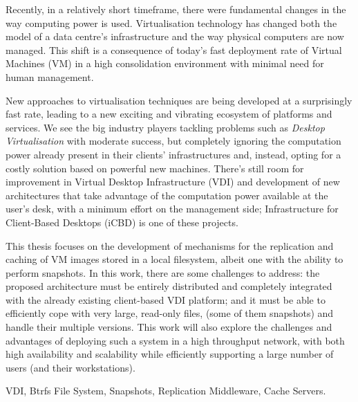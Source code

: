 
Recently, in a relatively short timeframe, there were fundamental changes in the way computing power is used. Virtualisation technology has changed both the model of a data centre’s infrastructure and the way physical computers are now managed. This shift is a consequence of today’s fast deployment rate of Virtual Machines (VM) in a high consolidation environment with minimal need for human management. 

New approaches to virtualisation techniques are being developed at a surprisingly fast rate, leading to a new exciting and vibrating ecosystem of platforms and services. We see the big industry players tackling problems such as \textit{Desktop Virtualisation} with moderate success, but completely ignoring the computation power already present in their clients’ infrastructures and, instead, opting for a costly solution based on powerful new machines. There’s still room for improvement in Virtual Desktop Infrastructure (VDI) and development of new architectures that take advantage of the computation power available at the user’s desk, with a minimum effort on the management side; Infrastructure for Client-Based Desktops (iCBD) is one of these projects. 

This thesis focuses on the development of mechanisms for the replication and caching of VM images stored in a local filesystem, albeit one with the ability to perform snapshots. In this work, there are some challenges to address: the proposed architecture must be entirely distributed and completely integrated with the already existing client-based VDI platform; and it must be able to efficiently cope with very large, read-only files, (some of them snapshots) and handle their multiple versions. This work will also explore the challenges and advantages of deploying such a system in a high throughput network, with both high availability and scalability while efficiently supporting a large number of users (and their workstations).


\begin{keywords}
	VDI, Btrfs File System, Snapshots, Replication Middleware, Cache Servers.
\end{keywords} 

